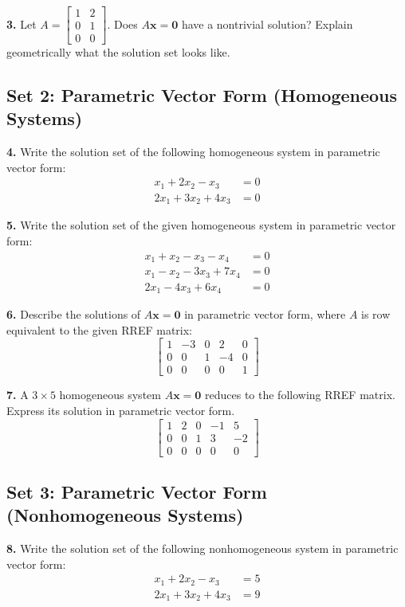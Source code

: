 \documentclass[12pt]{article}
\begin{document}
\textbf{3.} Let $A = \begin{bmatrix} 1 & 2 \\ 0 & 1 \\ 0 & 0 \end{bmatrix}$. Does $A\mathbf{x} = \mathbf{0}$ have a nontrivial solution? Explain geometrically what the solution set looks like.

\subsection*{Set 2: Parametric Vector Form (Homogeneous Systems)}
\textbf{4.} Write the solution set of the following homogeneous system in parametric vector form:
\begin{align*}
    x_1 + 2x_2 - x_3 &= 0 \\
    2x_1 + 3x_2 + 4x_3 &= 0
\end{align*}

\textbf{5.} Write the solution set of the given homogeneous system in parametric vector form:
\begin{align*}
    x_1 + x_2 - x_3 - x_4 &= 0 \\
    x_1 - x_2 - 3x_3 + 7x_4 &= 0 \\
    2x_1 - 4x_3 + 6x_4 &= 0
\end{align*}

\textbf{6.} Describe the solutions of $A\mathbf{x} = \mathbf{0}$ in parametric vector form, where $A$ is row equivalent to the given RREF matrix:
$$\begin{bmatrix} 1 & -3 & 0 & 2 & 0 \\ 0 & 0 & 1 & -4 & 0 \\ 0 & 0 & 0 & 0 & 1 \end{bmatrix}$$

\textbf{7.} A $3 \times 5$ homogeneous system $A\mathbf{x} = \mathbf{0}$ reduces to the following RREF matrix. Express its solution in parametric vector form.
$$\begin{bmatrix} 1 & 2 & 0 & -1 & 5 \\ 0 & 0 & 1 & 3 & -2 \\ 0 & 0 & 0 & 0 & 0 \end{bmatrix}$$

\subsection*{Set 3: Parametric Vector Form (Nonhomogeneous Systems)}
\textbf{8.} Write the solution set of the following nonhomogeneous system in parametric vector form:
\begin{align*}
    x_1 + 2x_2 - x_3 &= 5 \\
    2x_1 + 3x_2 + 4x_3 &= 9
\end{align*}
\end{document}
